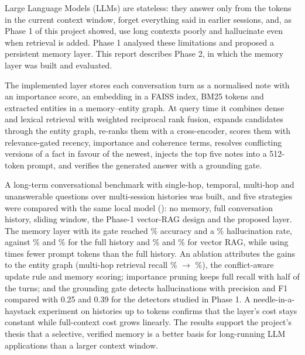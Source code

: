 Large Language Models (LLMs) are stateless: they answer only from the tokens in the current context
window, forget everything said in earlier sessions, and, as Phase 1 of this project showed, use long
contexts poorly and hallucinate even when retrieval is added. Phase 1 analysed these limitations and
proposed a persistent memory layer. This report describes Phase 2, in which the memory layer was built
and evaluated.

The implemented layer stores each conversation turn as a normalised note with an importance score, an
embedding in a FAISS index, BM25 tokens and extracted entities in a memory--entity graph. At query time
it combines dense and lexical retrieval with weighted reciprocal rank fusion, expands candidates through
the entity graph, re-ranks them with a cross-encoder, scores them with relevance-gated recency,
importance and coherence terms, resolves conflicting versions of a fact in favour of the newest, injects
the top five notes into a 512-token prompt, and verifies the generated answer with a grounding gate.

A long-term conversational benchmark with \nQuestions{} single-hop, temporal, multi-hop and unanswerable
questions over \nUsers{} multi-session histories was built, and five strategies were compared with the
same local model (\llmName): no memory, full conversation history, sliding window, the Phase-1
vector-RAG design and the proposed layer. The memory layer with its gate reached \accMemGate\% accuracy
and a \halMemGate\% hallucination rate, against \accFull\% and \halFull\% for the full history and
\accRag\% and \halRag\% for vector RAG, while using \tokRatioFullMem{} times fewer prompt tokens than the
full history. An ablation attributes the gains to the entity graph (multi-hop retrieval recall
\rFiveVecMH\% $\rightarrow$ \rFiveMemMH\%), the conflict-aware update rule and memory scoring; importance
pruning keeps full recall with half of the turns; and the grounding gate detects hallucinations with
precision \gatePMem{} and F1 \gateFMem{} compared with 0.25 and 0.39 for the detectors studied in Phase 1.
A needle-in-a-haystack experiment on histories up to \niahMaxLen{} tokens confirms that the layer's cost
stays constant while full-context cost grows linearly. The results support the project's thesis that a
selective, verified memory is a better basis for long-running LLM applications than a larger context
window.
